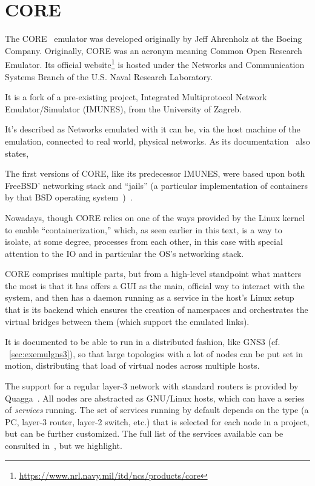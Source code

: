 \section{CORE}
\label{sec:exemulcore}

The CORE~\cite{coreemulator} emulator was developed originally by Jeff Ahrenholz at the Boeing Company.
Originally, CORE was an acronym meaning Common Open Research Emulator.
Its official website\footnote{\url{https://www.nrl.navy.mil/itd/ncs/products/core}} is hosted under the Networks and Communication Systems Branch of the U.S. Naval Research Laboratory.

It is a fork of a pre-existing project, Integrated Multiprotocol Network Emulator/Simulator (IMUNES), from the University of Zagreb.

It's described as 
Networks emulated with it can be, via the host machine of the emulation, connected to real world, physical networks.
As its documentation~
\cite{coreghdocs} also states, 

The first versions of CORE, like its predecessor IMUNES, were based upon both FreeBSD' networking stack and ``jails'' (a particular implementation of containers by that BSD operating system~\cite{freebsdjails})~\cite{comparisonofcore}.

Nowadays, though CORE relies on one of the ways provided by the Linux kernel to enable ``containerization,'' which, as seen earlier in this text, is a way to isolate, at some degree, processes from each other, in this case with special attention to the IO and in particular the OS's networking stack. %

CORE comprises multiple parts, but from a high-level standpoint what matters the most is that it has offers a GUI as the main, official way to interact with the system, and then has a daemon running as a service in the host's Linux setup that is its backend which ensures the creation of namespaces and orchestrates the virtual bridges between them (which support the emulated links).

It is documented to be able to run in a distributed fashion, like GNS3 (cf. ~\ref{sec:exemulgns3}), so that large topologies with a lot of nodes can be put set in motion, distributing that load of virtual nodes across multiple hosts.

The support for a regular layer-3 network with standard routers is provided by Quagga~\cite{quagga}.
All nodes are abstracted as GNU/Linux hosts, which can have a series of \emph{services} running.
The set of services running by default depends on the type (a PC, layer-3 router, layer-2 switch, etc.) that is selected for each node in a project, but can be further customized.
The full list of the services available can be consulted in~\cite{coreemuservices}, but we highlight. %

